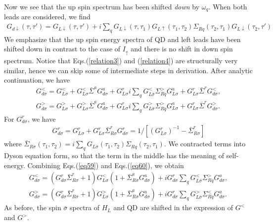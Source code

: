 \documentclass[aps,prb,superscriptaddress]{revtex4-2}
\begin{document}
Now we see that the up spin spectrum has been shifted {\it down} by $\omega_q$. When both leads are considered, we find
\begin{eqnarray}\label{Gd-dn}
G_{d\downarrow}(\tau,\tau') =G_{L\downarrow}(\tau,\tau') + i\sum_q G_{L\downarrow}(\tau,\tau_1)  G_{L\uparrow}(\tau_1,\tau_2)\Sigma_{Rq}(\tau_2,\tau_1) G_{L\downarrow}(\tau_2,\tau')
\end{eqnarray}
We emphasize that the up spin energy spectra of QD and left leads have been shifted down in contrast to the case of $I_\uparrow$ and there is no shift in down spin spectrum. Notice that Eqs.(\ref{relation3}) and (\ref{relation4}) are structurally very similar, hence we can skip some of intermediate steps in derivation. After analytic continuation, we have
\begin{gather}
G^<_{d\sigma} =G^<_{L\sigma} + G^<_{L\sigma}{\bar \Sigma}^a G^a_{d\sigma}
+G^r_{L\sigma} i\sum_q G^<_{L\bar\sigma}\Sigma_{Rq}^> G^a_{L\sigma} + G^r_{L\sigma} {\bar \Sigma}^r G^<_{d\sigma}, \label{eq59}\\
G^>_{d\sigma} =G^>_{L\sigma} + G^>_{L\sigma}{\bar \Sigma}^a G^a_{d\sigma}
+G^r_{L\sigma} i\sum_q G^>_{L\bar\sigma}\Sigma_{Rq}^> G^a_{L\sigma} + G^r_{L\sigma} {\bar \Sigma}^r G^>_{d\sigma}. \label{eq592}
\end{gather}
For $G^r_{d\sigma}$, we have
\begin{eqnarray}
G^r_{d\sigma} =G^r_{L\sigma} + G^r_{L\sigma} {\bar \Sigma}_{R\sigma}^r
G^r_{d\sigma} = 1/[(G^r_{L\sigma})^{-1} - {\bar \Sigma}_{R\sigma}^r]  \label{eq60}
\end{eqnarray}
where ${\bar \Sigma}_{R\sigma}(\tau_1,\tau_2) =i\sum_q G_{L\bar\sigma}(\tau_1,\tau_2)\Sigma_{Rq}(\tau_2,\tau_1)$. We contracted terms into Dyson equation form, so that the term in the middle has the meaning of self-energy. Combining Eqs.(\ref{eq59}) and Eqs.(\ref{eq60}), we obtain
\begin{gather}
G^<_{d\sigma} =(G^r_{d\sigma}{\bar \Sigma}_{R\sigma}^r+1) G^<_{L\sigma} (1+{\bar \Sigma}_{R\sigma}^a
G^a_{d\sigma}) +i G^r_{d\sigma} \sum_q G^<_{L\bar\sigma}\Sigma_{Rq}^> G^a_{d\sigma} \nonumber,\\
G^>_{d\sigma} =(G^r_{d\sigma}{\bar \Sigma}_{R\sigma}^r+1) G^>_{L\sigma} (1+{\bar \Sigma}_{R\sigma}^a
G^a_{d\sigma}) +i G^r_{d\sigma} \sum_q G^>_{L\bar\sigma}\Sigma_{Rq}^< G^a_{d\sigma} \nonumber.
\end{gather}
As before, the spin $\bar\sigma$ spectra of $H_L$ and QD are shifted in the expression of $G^<$ and $G^>$.
\end{document}
